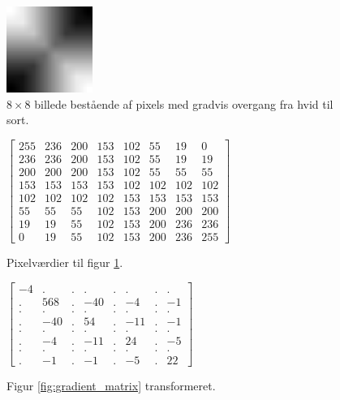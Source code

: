 \begin{figure}[htbp]
\centering
\includegraphics[width=0.25\textwidth]{Billeder/8x8_eks6.png}
\caption{$8\times8$ billede bestående af pixels med gradvis overgang fra hvid til sort.}
\label{fig:gradient}
\end{figure}

\begin{figure}[htbp]
\begin{minipage}[b]{0.5\linewidth}
\centering
$\begin{bmatrix}
255	&	236	&	200	&	153	&	102	&	55	&	19	&	0\\
236	&	236	&	200	&	153	&	102	&	55	&	19	&	19\\
200	&	200	&	200	&	153	&	102	&	55	&	55	&	55\\
153	&	153	&	153	&	153	&	102	&	102	&	102	&	102\\
102	&	102	&	102	&	102	&	153	&	153	&	153	&	153\\
55	&	55	&	55	&	102	&	153	&	200	&	200	&	200\\
19	&	19	&	55	&	102	&	153	&	200	&	236	&	236\\
0	&	19	&	55	&	102	&	153	&	200	&	236	&	255
\end{bmatrix}$
\caption{Pixelværdier til figur \ref{fig:gradient}.\label{fig:gradient_matrix}}
\end{minipage}
\hspace{0.5cm}
\begin{minipage}[b]{0.5\linewidth}
\centering
$\begin{bmatrix}
-4	&	.	&	.	&	.	&	.	&	.	&	.	&	.	\\
.	&	568	&	.	&	-40	&	.	&	-4	&	.	&	-1	\\
.	&	.	&	.	&	.	&	.	&	.	&	.	&	.	\\
.	&	-40	&	.	&	54	&	.	&	-11	&	.	&	-1	\\
.	&	.	&	.	&	.	&	.	&	.	&	.	&	.	\\
.	&	-4	&	.	&	-11	&	.	&	24	&	.	&	-5	\\
.	&	.	&	.	&	.	&	.	&	.	&	.	&	.	\\
.	&	-1	&	.	&	-1	&	.	&	-5	&	.	&	22
\end{bmatrix}$
\caption{Figur \ref{fig:gradient_matrix} transformeret.\label{fig:trans_matrix3}}
\end{minipage}
\end{figure}

